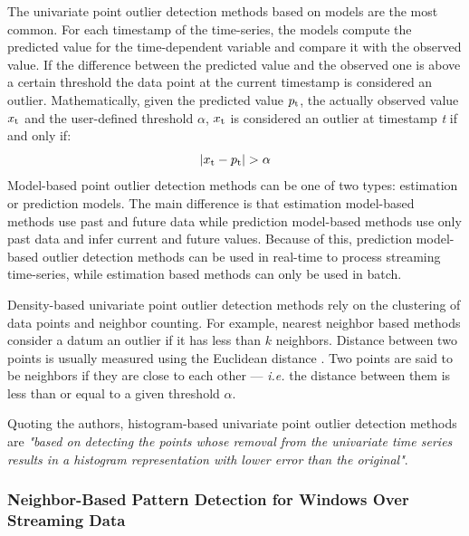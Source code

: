 The univariate point outlier detection methods based on models are the most common. For each timestamp of the time-series, the models compute the predicted value for the time-dependent variable and compare it with the observed value. If the difference between the predicted value and the observed one is above a certain threshold the data point at the current timestamp is considered an outlier. Mathematically, given the predicted value $p\textsubscript{t}$, the actually observed value $x\textsubscript{t}$ and the user-defined threshold $\alpha$, $x\textsubscript{t}$ is considered an outlier at timestamp \textit{t} if and only if:
\begin{equation*}
    |x\textsubscript{t}-p\textsubscript{t}|>\alpha
\end{equation*}
Model-based point outlier detection methods can be one of two types: estimation or prediction models. The main difference is that estimation model-based methods use past and future data while prediction model-based methods use only past data and infer current and future values. Because of this, prediction model-based outlier detection methods can be used in real-time to process streaming time-series, while estimation based methods can only be used in batch.

Density-based univariate point outlier detection methods rely on the clustering of data points and neighbor counting. For example, nearest neighbor based methods consider a datum an outlier if it has less than $k$ neighbors. Distance between two points is usually measured using the Euclidean distance \cite{elementary-algebra}. Two points are said to be neighbors if they are close to each other --- \textit{i.e.} the distance between them is less than or equal to a given threshold $\alpha$.

Quoting the authors, histogram-based univariate point outlier detection methods are \textit{"based on detecting the points whose removal from the univariate time series results in a histogram representation with lower error than the original"}.

\subsubsection{Neighbor-Based Pattern Detection for Windows Over Streaming Data} \label{alg:extran}
 
